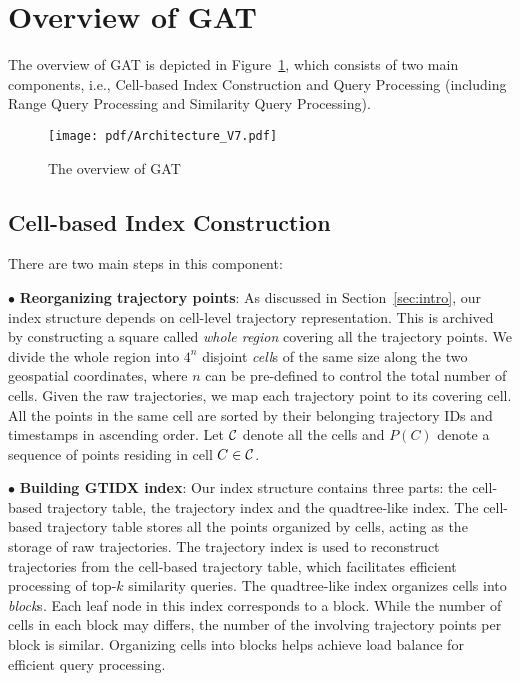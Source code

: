 \documentclass[10pt,conference,letterpaper]{IEEEtran}
\newcommand{\frname}{GAT\xspace }
\newcommand{\idxname}{GTIDX\xspace }
\newcommand{\allcell}{{\cal C}\xspace}
\begin{document}
\section{Overview of \frname}\label{sec:framework}




The overview of \frname is depicted in Figure~\ref{fig:arch}, which consists of two main components, i.e., Cell-based Index Construction and Query Processing (including Range Query Processing and Similarity Query Processing).

\begin{figure}[t]
	\centering
	\texttt{[image: pdf/Architecture\_V7.pdf]}
	\vspace{-.2in}
	\caption{The overview of \frname}\label{fig:arch}
	\vspace{-.1in}
\end{figure}

\subsection{Cell-based Index Construction}

There are two main steps in this component:

\vspace{0.1cm}$\bullet$ {\bf Reorganizing trajectory points}:
As discussed in Section~\ref{sec:intro}, our index structure depends on cell-level trajectory representation. This is archived by constructing a square called \emph{whole region}
covering all the trajectory points. We divide the whole region into $4^n$ disjoint \emph{cell}s of the same size along the two geospatial coordinates, where $n$ can be pre-defined to control the total number of cells. Given the raw trajectories, we map each trajectory point to its covering cell. All the points in the same cell are sorted by their belonging trajectory IDs and timestamps in ascending order. Let $\allcell$ denote all the cells and $P(C)$ denote a sequence of points residing in cell $C\in \allcell$.


\vspace{0.1cm}$\bullet$ {\bf Building \idxname index}:
Our index structure contains three parts: the cell-based trajectory table, the trajectory index and the quadtree-like index.
The cell-based trajectory table stores all the points organized by cells, acting as the storage of raw trajectories.
The trajectory index is used to reconstruct trajectories from the cell-based trajectory table, which facilitates efficient processing of top-$k$ similarity queries.
The quadtree-like index organizes cells into \emph{block}s. Each leaf node in this index corresponds to a block. While the number of cells in each block may differs, the number of the involving trajectory points per block is similar. Organizing cells into blocks helps achieve load balance for efficient query processing.
\end{document}
